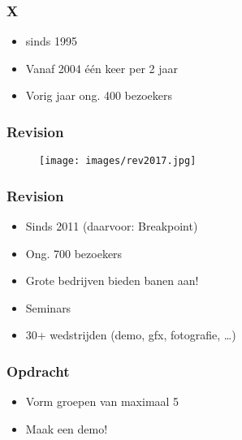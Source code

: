 \documentclass[aspectratio=43]{uva-inf-presentation}
\begin{document}

\begin{frame}
\frametitle{X}

\begin{itemize}
\item sinds 1995
\item Vanaf 2004 \'e\'en keer per 2 jaar
\item Vorig jaar ong. 400 bezoekers
\end{itemize}

\end{frame}


\begin{frame}
\frametitle{Revision}

\begin{figure}
\texttt{[image: images/rev2017.jpg]}
\end{figure}

\end{frame}


\begin{frame}
\frametitle{Revision}

\begin{itemize}
\item Sinds 2011 (daarvoor: Breakpoint)
\item Ong. 700 bezoekers
\item Grote bedrijven bieden banen aan!
\item Seminars
\item 30+ wedstrijden (demo, gfx, fotografie, \dots)
\end{itemize}

\end{frame}


\begin{frame}
\frametitle{Opdracht}

\begin{itemize}
\item Vorm groepen van maximaal 5
\item Maak een demo!
\end{itemize}

\end{frame}

\end{document}
